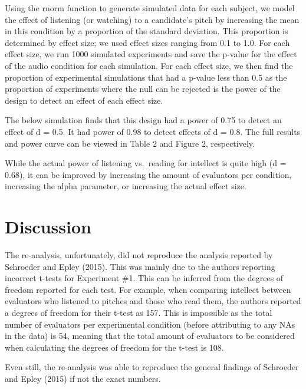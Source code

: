 \documentclass[
  english,
  man]{apa6}
\begin{document}
Using the rnorm function to generate simulated data for each subject, we model the effect of listening (or watching) to a candidate's pitch by increasing the mean in this condition by a proportion of the standard deviation. This proportion is determined by effect size; we used effect sizes ranging from 0.1 to 1.0. For each effect size, we run 1000 simulated experiments and save the p-value for the effect of the audio condition for each simulation. For each effect size, we then find the proportion of experimental simulations that had a p-value less than 0.5 as the proportion of experiments where the null can be rejected is the power of the design to detect an effect of each effect size.

The below simulation finds that this design had a power of 0.75 to detect an effect of d = 0.5. It had power of 0.98 to detect effects of d = 0.8. The full results and power curve can be viewed in Table 2 and Figure 2, respectively.

While the actual power of listening vs.~reading for intellect is quite high (d = 0.68), it can be improved by increasing the amount of evaluators per condition, increasing the alpha parameter, or increasing the actual effect size.

\hypertarget{discussion}{%
\section{Discussion}\label{discussion}}

The re-analysis, unfortunately, did not reproduce the analysis reported by Schroeder and Epley (2015). This was mainly due to the authors reporting incorrect t-tests for Experiment \#1. This can be inferred from the degrees of freedom reported for each test. For example, when comparing intellect between evaluators who listened to pitches and those who read them, the authors reported a degrees of freedom for their t-test as 157. This is impossible as the total number of evaluators per experimental condition (before attributing to any NAs in the data) is 54, meaning that the total amount of evaluators to be considered when calculating the degrees of freedom for the t-test is 108.

Even still, the re-analysis was able to reproduce the general findings of Schroeder and Epley (2015) if not the exact numbers.
\end{document}
